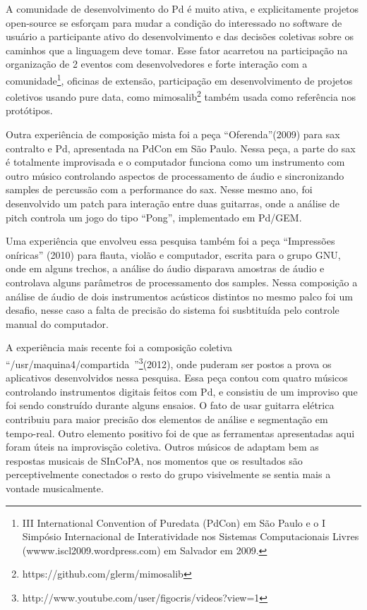 \documentclass[draft]{ppgmus}
\begin{document}
A comunidade de desenvolvimento do Pd é muito ativa, e explicitamente projetos open-source
se esforçam para mudar a condição do interessado no software de usuário a participante ativo do desenvolvimento
e das decisões coletivas sobre os caminhos que a linguagem deve tomar. Esse  fator acarretou na participação na
organização de 2 eventos com desenvolvedores e forte interação com a comunidade\footnote{III International
Convention of Puredata (PdCon) em São Paulo e o I Simpósio Internacional de Interatividade nos Sistemas
Computacionais Livres (wwww.iscl2009.wordpress.com) em Salvador em 2009.}, oficinas de extensão, 
participação em desenvolvimento de projetos coletivos usando pure data, como mimosalib\footnote
{https://github.com/glerm/mimosalib} também usada como referência nos protótipos.

Outra experiência de composição mista foi a peça ``Oferenda''(2009) para sax contralto e Pd, 
apresentada na PdCon em São Paulo. Nessa peça, a parte do sax é totalmente improvisada e 
o computador funciona como um instrumento com outro músico controlando aspectos de 
processamento de áudio e sincronizando samples de percussão com a performance do sax. 
Nesse mesmo ano, foi desenvolvido um patch para interação entre duas guitarras, onde a
análise de pitch controla um jogo do tipo ``Pong'', implementado em Pd/GEM. 

Uma experiência que envolveu essa pesquisa também foi a peça ``Impressões oníricas'' (2010) para flauta,
violão e computador, escrita para o grupo GNU, onde em alguns trechos, a análise do áudio
disparava amostras de áudio e controlava alguns parâmetros de processamento dos samples. 
Nessa composição a análise de áudio de dois instrumentos acústicos distintos no mesmo palco foi 
um desafio, nesse caso a falta de precisão do sistema foi susbtituída pelo controle manual
do computador.

A experiência mais recente foi a composição coletiva ``/usr/maquina4/compartida~''\footnote
{http://www.youtube.com/user/figocris/videos?view=1}(2012), onde puderam
ser postos a prova os aplicativos desenvolvidos nessa pesquisa. Essa peça contou com quatro
músicos controlando instrumentos digitais feitos com Pd, e consistiu de um improviso que foi
sendo construído durante alguns ensaios. O fato de usar guitarra elétrica
contribuiu para maior precisão dos elementos de análise e segmentação em tempo-real.
Outro elemento positivo foi de que as ferramentas apresentadas aqui foram úteis na 
improvisção coletiva. Outros músicos de adaptam bem as respostas musicais de SInCoPA, nos momentos que 
os resultados são perceptivelmente conectados o resto do grupo visivelmente se sentia mais
a vontade musicalmente.
\end{document}
